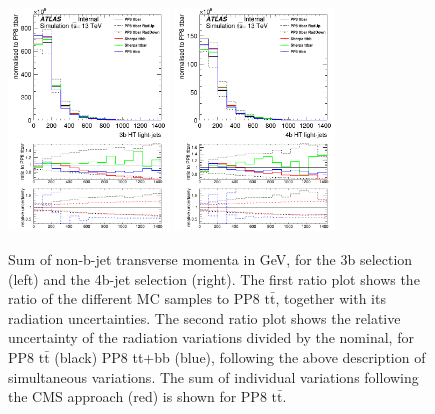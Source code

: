 \begin{figure}[!htb]
\centering
\includegraphics[width=0.38\textwidth]{Plots/ttbb/hisgenHTljets_4j3t__div}
\includegraphics[width=0.38\textwidth]{Plots/ttbb/hisgenHTljets_4j4t__div}
  \caption{Sum of non-b-jet transverse momenta in GeV, for the 3b selection (left) and the 4b-jet selection (right). The first ratio plot shows the ratio of the different MC samples to PP8 $\mathrm{t\bar{t}}$, together with its radiation uncertainties. The second ratio plot shows the relative uncertainty of the radiation variations divided by the nominal, for PP8 $\mathrm{t\bar{t}}$ (black) PP8 tt+bb (blue), following the above description of simultaneous variations. The sum of individual variations following the CMS approach (red) is shown for PP8 $\mathrm{t\bar{t}}$. \label{ttbb:HTljets}}
\end{figure}


